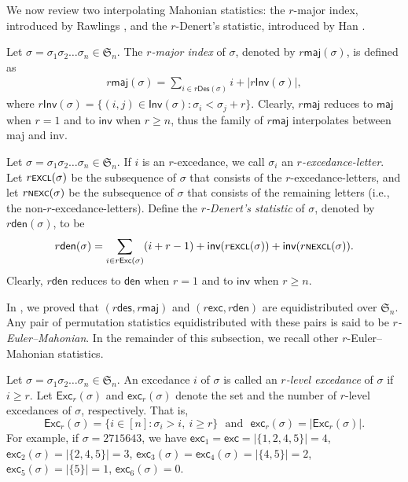 \documentclass[12pt]{article}
\begin{document}
We now review two interpolating Mahonian statistics:
the $r$-major index, introduced by Rawlings \cite{Rawlings-1981},
and the $r$-Denert's statistic, introduced by Han \cite{Han-1991-thesis}.

Let $\sigma=\sigma_{1}\sigma_{2}\ldots \sigma_{n}\in\mathfrak{S}_{n}$.
The \emph{$r$-major index} of $\sigma$, 
denoted by $r\textsf{maj}(\sigma)$, is defined as
\begin{align*}
	r\textsf{maj}(\sigma)=\sum_{i\in r\textsf{Des}(\sigma)}i +|r\textsf{Inv}(\sigma)|,
\end{align*}
where $r\textsf{Inv}(\sigma)=\{(i,j)\in\textsf{Inv}(\sigma): \sigma_{i}<\sigma_{j}+r\}.$
Clearly, $r\textsf{maj}$ reduces to $\textsf{maj}$  when $r=1$ and to $\textsf{inv}$ when $r\geq n$,
thus the family of $r\textsf{maj}$ interpolates between \textsf{maj} and \textsf{inv}.

Let $\sigma=\sigma_{1}\sigma_{2}\ldots \sigma_{n}\in\mathfrak{S}_{n}$. 
If $i$ is an $r$-excedance,
we call $\sigma_{i}$ an \emph{$r$-excedance-letter}.
Let $r\textsf{\scriptsize{EXCL}}(\sigma)$ be the subsequence of $\sigma$ that consists of the $r$-excedance-letters,
and let $r\textsf{\scriptsize{NEXC}}(\sigma)$ be the subsequence of $\sigma$ that consists of the remaining letters (i.e., the non-$r$-excedance-letters).
Define the \emph{$r$-Denert's statistic} of $\sigma$, denoted by $r\textsf{den}(\sigma)$, to be 
\begin{align*}
	r\textsf{den}(\sigma)=\sum_{i\in r\textsf{Exc}(\sigma)}(i+r-1)+\textsf{inv}(r\textsf{\scriptsize{EXCL}}(\sigma))+\textsf{inv}(r\textsf{\scriptsize{NEXCL}}(\sigma)).
\end{align*}
Clearly, $r\textsf{den}$ reduces to $\textsf{den}$  when $r=1$ and to $\textsf{inv}$ when $r\geq n$.

In \cite{Liu-2024}, we proved that $(r\textsf{des},r\textsf{maj})$ and $(r\textsf{exc},r\textsf{den})$ are equidistributed over $\mathfrak{S}_{n}$.
Any pair of permutation statistics equidistributed with these pairs is said to be \emph{$r$-Euler--Mahonian}.
In the remainder of this subsection, we recall other $r$-Euler--Mahonian statistics.

Let $\sigma=\sigma_{1}\sigma_{2}\ldots \sigma_{n}\in\mathfrak{S}_{n}$. 
An excedance $i$ of $\sigma$ is called an \emph{$r$-level excedance} of $\sigma$ if  $i\geq r$.
Let $\textsf{Exc}_{r}(\sigma)$ and $\textsf{exc}_{r}(\sigma)$ denote the set and the number of $r$-level excedances of $\sigma$, respectively. That is,
$$\textsf{Exc}_{r}(\sigma)=\{i\in[n]:\sigma_{i}>i,~i\geq r\}\text{~~and~~}\textsf{exc}_{r}(\sigma)=|\textsf{Exc}_{r}(\sigma)|.$$
For example, if $\sigma=2715643$, we have  $\textsf{exc}_{1}=\textsf{exc}=|\{1,2,4,5\}|=4$,
$\textsf{exc}_{2}(\sigma)=|\{2,4,5\}|=3$,
$\textsf{exc}_{3}(\sigma)=\textsf{exc}_{4}(\sigma)=|\{4,5\}|=2$,
$\textsf{exc}_{5}(\sigma)=|\{5\}|=1$,
$\textsf{exc}_{6}(\sigma)=0$.
\end{document}
